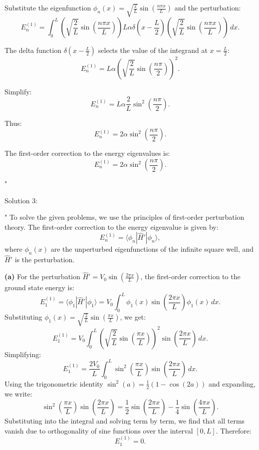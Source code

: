 Substitute the eigenfunction \(\phi_n(x) = \sqrt{\frac{2}{L}} \sin\left(\frac{n \pi x}{L}\right)\) and the perturbation:
\[
E_n^{(1)} = \int_0^L \left(\sqrt{\frac{2}{L}} \sin\left(\frac{n \pi x}{L}\right)\right) L \alpha \delta\left(x - \frac{L}{2}\right) \left(\sqrt{\frac{2}{L}} \sin\left(\frac{n \pi x}{L}\right)\right) \, dx.
\]

The delta function \(\delta\left(x - \frac{L}{2}\right)\) selects the value of the integrand at \(x = \frac{L}{2}\):
\[
E_n^{(1)} = L \alpha \left(\sqrt{\frac{2}{L}} \sin\left(\frac{n \pi}{2}\right)\right)^2.
\]

Simplify:
\[
E_n^{(1)} = L \alpha \frac{2}{L} \sin^2\left(\frac{n \pi}{2}\right).
\]

Thus:
\[
E_n^{(1)} = 2 \alpha \sin^2\left(\frac{n \pi}{2}\right).
\]

The first-order correction to the energy eigenvalues is:
\[
E_n^{(1)} = 2 \alpha \sin^2\left(\frac{n \pi}{2}\right).
\]

"

Solution 3:

"
To solve the given problems, we use the principles of first-order perturbation theory. The first-order correction to the energy eigenvalue is given by:
\[
E_n^{(1)} = \langle \phi_n | \hat{H}' | \phi_n \rangle,
\]
where \(\phi_n(x)\) are the unperturbed eigenfunctions of the infinite square well, and \(\hat{H}'\) is the perturbation.

\textbf{(a)} For the perturbation \(\hat{H}' = V_0 \sin\left(\frac{2\pi x}{L}\right)\), the first-order correction to the ground state energy is:
\[
E_1^{(1)} = \langle \phi_1 | \hat{H}' | \phi_1 \rangle = V_0 \int_0^L \phi_1(x) \sin\left(\frac{2\pi x}{L}\right) \phi_1(x) \, dx.
\]
Substituting \(\phi_1(x) = \sqrt{\frac{2}{L}} \sin\left(\frac{\pi x}{L}\right)\), we get:
\[
E_1^{(1)} = V_0 \int_0^L \left(\sqrt{\frac{2}{L}} \sin\left(\frac{\pi x}{L}\right)\right)^2 \sin\left(\frac{2\pi x}{L}\right) \, dx.
\]
Simplifying:
\[
E_1^{(1)} = \frac{2 V_0}{L} \int_0^L \sin^2\left(\frac{\pi x}{L}\right) \sin\left(\frac{2\pi x}{L}\right) \, dx.
\]
Using the trigonometric identity \(\sin^2(a) = \frac{1}{2} (1 - \cos(2a))\) and expanding, we write:
\[
\sin^2\left(\frac{\pi x}{L}\right) \sin\left(\frac{2\pi x}{L}\right) = \frac{1}{2} \sin\left(\frac{2\pi x}{L}\right) - \frac{1}{4} \sin\left(\frac{4\pi x}{L}\right).
\]
Substituting into the integral and solving term by term, we find that all terms vanish due to orthogonality of sine functions over the interval \([0, L]\). Therefore:
\[
E_1^{(1)} = 0.
\]

